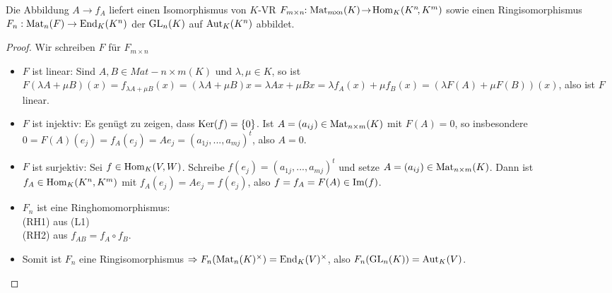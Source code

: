 \begin{proposition}
	Die Abbildung $A\to f_A$ liefert einen Isomorphismus von $K$-VR $F_{m\times n}\!\!: \operatorname{Mat}_{m\!\times\!n}(K)
	\!\to\! \operatorname{Hom}_K(K^n\!,K^m)$ sowie einen Ringisomorphismus $F_n:\operatorname{Mat}_n(F)\to \operatorname{End}_K(K^n)$ der $\operatorname{GL}_n(K)$ auf $\operatorname{Aut}_K(K^n)$ 
	abbildet.
\end{proposition}
\begin{proof}
	Wir schreiben $F$ für $F_{m\times n}$
	\begin{itemize}
		\item $F$ ist linear: Sind $A,B\in Mat-{n\times m}(K)$ und $\lambda,\mu\in K$, so ist $F(\lambda A+\mu B)(x)=
		f_{\lambda A+\mu B}(x)=(\lambda A+\mu B)x=\lambda Ax+\mu Bx=\lambda f_A(x)+\mu f_B(x)=(\lambda F(A)+\mu F(B))(x)$, 
		also ist $F$ linear.
		\item $F$ ist injektiv: Es genügt zu zeigen, dass $\operatorname{Ker}(f)=\{0\}$. Ist $A=(a_{ij})\in \operatorname{Mat}_{n\times m}(K)$ mit $F(A)=0$, 
		so insbesondere $0=F(A)(e_j)=f_A(e_j)=Ae_j=(a_{1j},...,a_{mj})^t$, also $A=0$.
		\item $F$ ist surjektiv: Sei $f\in \operatorname{Hom}_K(V,W)$. Schreibe $f(e_j)=(a_{1j},...,a_{mj})^t$ und setze $A=(a_{ij})\in 
		\operatorname{Mat}_{n\times m}(K)$. Dann ist $f_A\in \operatorname{Hom}_K(K^n,K^m)$ mit $f_A(e_j)=Ae_j=f(e_j)$, also $f=f_A=F(A)\in \operatorname{Im}(f)$.
		\item $F_n$ ist eine Ringhomomorphismus: \\
		(RH1) aus (L1) \\
		(RH2) aus $f_{AB}=f_A\circ f_B$.
		\item Somit ist $F_n$ eine Ringisomorphismus $\Rightarrow F_n(\operatorname{Mat}_n(K)^{\times})=\operatorname{End}_K(V)^{\times}$, also $F_n(
		\operatorname{GL}_n(K))=\operatorname{Aut}_K(V)$.
	\end{itemize}
\end{proof}